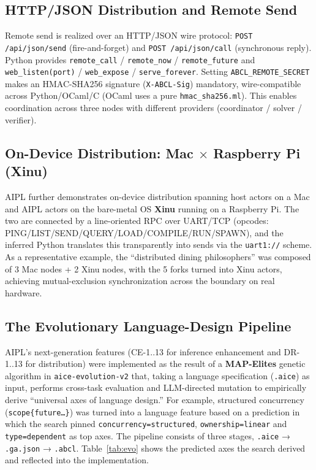 \documentclass[11pt,a4paper]{article}
\newcommand{\code}[1]{\texttt{\small #1}}
\begin{document}
\subsection{HTTP/JSON Distribution and Remote Send}
Remote send is realized over an HTTP/JSON wire protocol:
\code{POST /api/json/send} (fire-and-forget) and
\code{POST /api/json/call} (synchronous reply). Python provides
\code{remote\_call} / \code{remote\_now} / \code{remote\_future} and
\code{web\_listen(port)} / \code{web\_expose} / \code{serve\_forever}.
Setting \code{ABCL\_REMOTE\_SECRET} makes an HMAC-SHA256 signature
(\code{X-ABCL-Sig}) mandatory, wire-compatible across Python/OCaml/C
(OCaml uses a pure \code{hmac\_sha256.ml}). This enables coordination
across three nodes with different providers (coordinator / solver /
verifier).

\subsection{On-Device Distribution: Mac $\times$ Raspberry Pi (Xinu)}
AIPL further demonstrates on-device distribution spanning host actors on
a Mac and AIPL actors on the bare-metal OS \textbf{Xinu} running on a
Raspberry Pi. The two are connected by a line-oriented RPC over UART/TCP
(opcodes: PING/LIST/SEND/QUERY/LOAD/COMPILE/RUN/SPAWN), and the inferred
Python translates this transparently into sends via the \code{uart1://}
scheme. As a representative example, the ``distributed dining
philosophers'' was composed of 3 Mac nodes + 2 Xinu nodes, with the 5
forks turned into Xinu actors, achieving mutual-exclusion synchronization
across the boundary on real hardware.

\subsection{The Evolutionary Language-Design Pipeline}\label{sec:evo}
AIPL's next-generation features (CE-1..13 for inference enhancement and
DR-1..13 for distribution) were implemented as the result of a
\textbf{MAP-Elites} genetic algorithm in \code{aice-evolution-v2} that,
taking a language specification (\code{.aice}) as input, performs
cross-task evaluation and LLM-directed mutation to empirically derive
``universal axes of language design.'' For example, structured
concurrency (\code{scope\{future\dots\}}) was turned into a language
feature based on a prediction in which the search pinned
\code{concurrency=structured}, \code{ownership=linear} and
\code{type=dependent} as top axes. The pipeline consists of three stages,
\code{.aice} → \code{.ga.json} → \code{.abcl}. Table~\ref{tab:evo} shows
the predicted axes the search derived and reflected into the
implementation.
\end{document}
